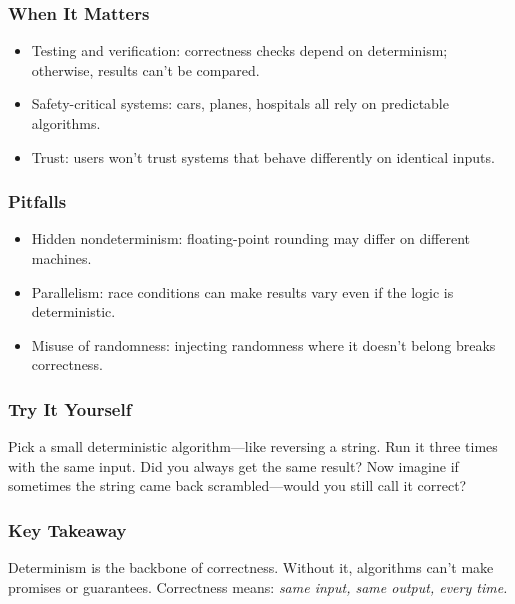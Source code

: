 \documentclass[
  letterpaper,
  DIV=11,
  numbers=noendperiod]{scrreprt}
\providecommand{\tightlist}{%
  \setlength{\itemsep}{0pt}\setlength{\parskip}{0pt}}
\begin{document}
\subsubsection{When It Matters}\label{when-it-matters-21}

\begin{itemize}
\tightlist
\item
  Testing and verification: correctness checks depend on determinism;
  otherwise, results can't be compared.
\item
  Safety-critical systems: cars, planes, hospitals all rely on
  predictable algorithms.
\item
  Trust: users won't trust systems that behave differently on identical
  inputs.
\end{itemize}

\subsubsection{Pitfalls}\label{pitfalls-20}

\begin{itemize}
\tightlist
\item
  Hidden nondeterminism: floating-point rounding may differ on different
  machines.
\item
  Parallelism: race conditions can make results vary even if the logic
  is deterministic.
\item
  Misuse of randomness: injecting randomness where it doesn't belong
  breaks correctness.
\end{itemize}

\subsubsection{Try It Yourself}\label{try-it-yourself-23}

Pick a small deterministic algorithm---like reversing a string. Run it
three times with the same input. Did you always get the same result? Now
imagine if sometimes the string came back scrambled---would you still
call it correct?

\subsubsection{Key Takeaway}\label{key-takeaway-22}

Determinism is the backbone of correctness. Without it, algorithms can't
make promises or guarantees. Correctness means: \emph{same input, same
output, every time.}
\end{document}
